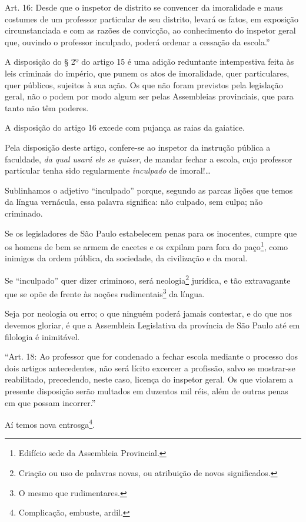 Art. 16: Desde que o inspetor de distrito se convencer da imoralidade e
maus costumes de um professor particular de seu distrito, levará os
fatos, em exposição circunstanciada e com as razões de convicção, ao
conhecimento do inspetor geral que, ouvindo o professor inculpado,
poderá ordenar a cessação da escola.''

A disposição do § 2º do artigo 15 é uma adição reduntante intempestiva
feita às leis criminais do império, que punem os atos de imoralidade,
quer particulares, quer públicos, sujeitos à sua ação. Os que não foram
previstos pela legislação geral, não o podem por modo algum ser pelas
Assembleias provinciais, que para tanto não têm poderes.

A disposição do artigo 16 excede com pujança as raias da gaiatice.

Pela disposição deste artigo, confere-se ao inspetor da instrução
pública a faculdade, \emph{da qual usará ele se quiser}, de mandar
fechar a escola, cujo professor particular tenha sido regularmente
\emph{inculpado} de imoral!\ldots{}

Sublinhamos o adjetivo ``inculpado'' porque, segundo as parcas lições que
temos da língua vernácula, essa palavra significa: não culpado, sem
culpa; não criminado.

Se os legisladores de São Paulo estabelecem penas para os inocentes,
cumpre que os homens de bem se armem de cacetes e os expilam para fora
do paço\footnote{Edifício sede da Assembleia Provincial.}, como
inimigos da ordem pública, da sociedade, da civilização e da moral.

Se ``inculpado'' quer dizer criminoso, será neologia\footnote{Criação ou
  uso de palavras novas, ou atribuição de novos significados.} jurídica,
e tão extravagante que se opõe de frente às noções
rudimentais\footnote{O mesmo que rudimentares.} da língua.

Seja por neologia ou erro; o que ninguém poderá jamais contestar, e do
que nos devemos gloriar, é que a Assembleia Legislativa da província de
São Paulo até em filologia é inimitável.

``Art. 18: Ao professor que for condenado a fechar escola mediante o
processo dos dois artigos antecedentes, não será lícito excercer a
profissão, salvo se mostrar-se reabilitado, precedendo, neste caso,
licença do inspetor geral. Os que violarem a presente disposição serão
multados em duzentos mil réis, além de outras penas em que possam
incorrer.''

Aí temos nova entrosga\footnote{Complicação, embuste, ardil.}.


